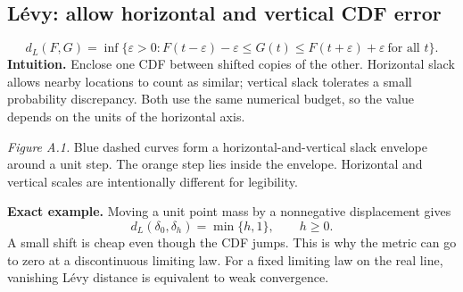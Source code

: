 \documentclass[12pt]{article}
\begin{document}
\subsection{L\'evy: allow horizontal and vertical CDF error}\label{sec:levy}
\begin{equation}
 d_L(F,G)=\inf\{\varepsilon>0:
 F(t-\varepsilon)-\varepsilon\le G(t)
 \le F(t+\varepsilon)+\varepsilon\ \text{for all }t\}.
\end{equation}
\textbf{Intuition.} Enclose one CDF between shifted copies of the other.
Horizontal slack allows nearby locations to count as similar; vertical
slack tolerates a small probability discrepancy. Both use the same numerical
budget, so the value depends on the units of the horizontal axis.

\begin{center}
\end{center}
\textit{Figure A.1.} Blue dashed curves form a horizontal-and-vertical
slack envelope around a unit step. The orange step lies inside the envelope.
Horizontal and vertical scales are intentionally different for legibility.

\textbf{Exact example.} Moving a unit point mass by a nonnegative displacement gives
\begin{equation}
 d_L(\delta_0,\delta_h)=\min\{h,1\},\qquad h\ge0.
\end{equation}
A small shift is cheap even though the CDF jumps. This is why the metric
can go to zero at a discontinuous limiting law. For a fixed limiting law
on the real line, vanishing L\'evy distance is equivalent to weak convergence.
\end{document}
